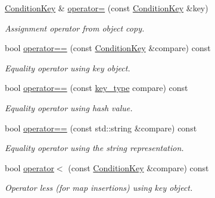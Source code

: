 \begin{DoxyCompactItemize}
\hyperlink{class_d_d4hep_1_1_conditions_1_1_condition_key}{ConditionKey} \& \hyperlink{class_d_d4hep_1_1_conditions_1_1_condition_key_a4b89b384d431b3699986aa21935ddd8b}{operator=} (const \hyperlink{class_d_d4hep_1_1_conditions_1_1_condition_key}{ConditionKey} \&key)
\begin{DoxyCompactList}\small\item\em Assignment operator from object copy. \item\end{DoxyCompactList}\item 
bool \hyperlink{class_d_d4hep_1_1_conditions_1_1_condition_key_a4d70a04fb5de2bcbf7b3f4ef2366b6da}{operator==} (const \hyperlink{class_d_d4hep_1_1_conditions_1_1_condition_key}{ConditionKey} \&compare) const 
\begin{DoxyCompactList}\small\item\em Equality operator using key object. \item\end{DoxyCompactList}\item 
bool \hyperlink{class_d_d4hep_1_1_conditions_1_1_condition_key_a469c6299819ff97644aba2c1e1ee3071}{operator==} (const \hyperlink{class_d_d4hep_1_1_conditions_1_1_condition_key_a08bfc8ccb807bdd5e4d9f3b065d1c8f5}{key\_\-type} compare) const 
\begin{DoxyCompactList}\small\item\em Equality operator using hash value. \item\end{DoxyCompactList}\item 
bool \hyperlink{class_d_d4hep_1_1_conditions_1_1_condition_key_a70be84b86389b63ca1d51c6a04baad82}{operator==} (const std::string \&compare) const 
\begin{DoxyCompactList}\small\item\em Equality operator using the string representation. \item\end{DoxyCompactList}\item 
bool \hyperlink{class_d_d4hep_1_1_conditions_1_1_condition_key_a76862dc605eb22d136bb98c77e8de247}{operator$<$} (const \hyperlink{class_d_d4hep_1_1_conditions_1_1_condition_key}{ConditionKey} \&compare) const 
\begin{DoxyCompactList}\small\item\em Operator less (for map insertions) using key object. \item\end{DoxyCompactList}\item 

\end{DoxyCompactItemize}
